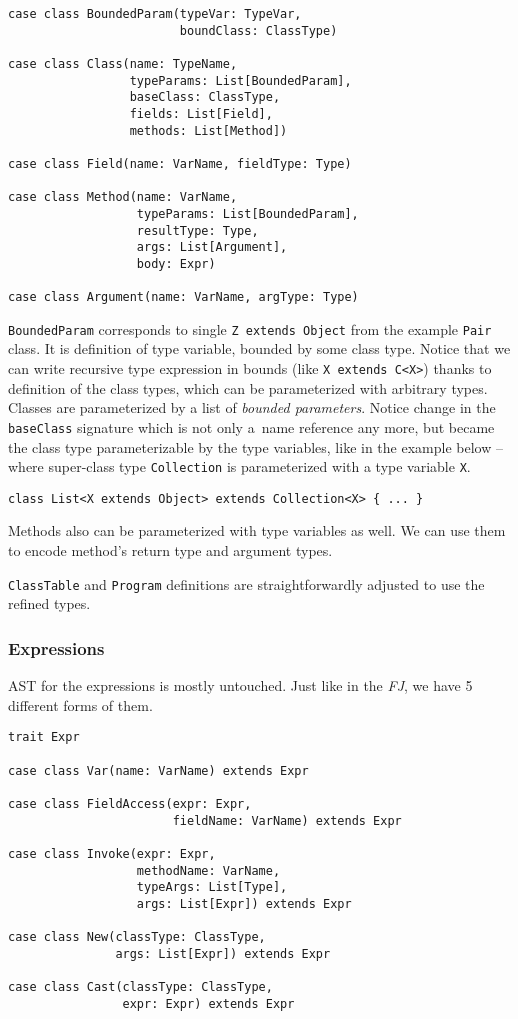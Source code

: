 \documentclass{article}[12pt]
\begin{document}
\begin{verbatim}
case class BoundedParam(typeVar: TypeVar,
                        boundClass: ClassType)

case class Class(name: TypeName,
                 typeParams: List[BoundedParam],
                 baseClass: ClassType,
                 fields: List[Field],
                 methods: List[Method])

case class Field(name: VarName, fieldType: Type)

case class Method(name: VarName,
                  typeParams: List[BoundedParam],
                  resultType: Type,
                  args: List[Argument],
                  body: Expr)
                  
case class Argument(name: VarName, argType: Type)
\end{verbatim}
\texttt{BoundedParam} corresponds to single
\texttt{Z extends Object} from the example \texttt{Pair} class.
It is definition
of type variable, bounded by some class type. Notice that we
can write recursive type expression in bounds
(like \texttt{X extends C<X>}) thanks to definition of the class
types, which can be parameterized with arbitrary types.
Classes are parameterized by a list of \emph{bounded parameters}.
Notice change in the \texttt{baseClass} signature which is not
only a~name reference any more, but became the class type
parameterizable by the type variables, like in the example below --
where super-class type \texttt{Collection} is parameterized with
a type variable \texttt{X}.

\begin{verbatim}
class List<X extends Object> extends Collection<X> { ... }
\end{verbatim}

Methods also can be parameterized with type variables as well.
We can use them to encode method's return type and argument
types.

\texttt{ClassTable} and \texttt{Program} definitions are
straightforwardly adjusted to use the refined types.

\subsubsection{Expressions}

AST for the expressions is mostly untouched. Just like in
the \emph{FJ}, we have 5 different forms of them.

\begin{verbatim}
trait Expr

case class Var(name: VarName) extends Expr

case class FieldAccess(expr: Expr,
                       fieldName: VarName) extends Expr

case class Invoke(expr: Expr,
                  methodName: VarName,
                  typeArgs: List[Type],
                  args: List[Expr]) extends Expr

case class New(classType: ClassType,
               args: List[Expr]) extends Expr

case class Cast(classType: ClassType,
                expr: Expr) extends Expr
\end{verbatim}
\end{document}
